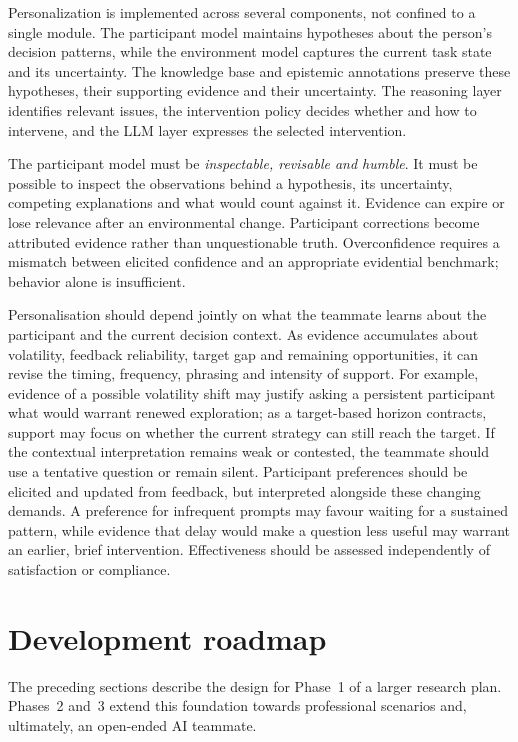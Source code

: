 \documentclass[11pt,a4paper]{article}
\begin{document}
Personalization is implemented across several components, not confined to a single module. The participant model maintains hypotheses about the person's decision patterns, while the environment model captures the current task state and its uncertainty. The knowledge base and epistemic annotations preserve these hypotheses, their supporting evidence and their uncertainty. The reasoning layer identifies relevant issues, the intervention policy decides whether and how to intervene, and the LLM layer expresses the selected intervention.

The participant model must be \emph{inspectable, revisable and humble}. It must be possible to inspect the observations behind a hypothesis, its uncertainty, competing explanations and what would count against it. Evidence can expire or lose relevance after an environmental change. Participant corrections become attributed evidence rather than unquestionable truth. Overconfidence requires a mismatch between elicited confidence and an appropriate evidential benchmark; behavior alone is insufficient.

Personalisation should depend jointly on what the teammate learns about the participant and the current decision context. As evidence accumulates about volatility, feedback reliability, target gap and remaining opportunities, it can revise the timing, frequency, phrasing and intensity of support. For example, evidence of a possible volatility shift may justify asking a persistent participant what would warrant renewed exploration; as a target-based horizon contracts, support may focus on whether the current strategy can still reach the target. If the contextual interpretation remains weak or contested, the teammate should use a tentative question or remain silent. Participant preferences should be elicited and updated from feedback, but interpreted alongside these changing demands. A preference for infrequent prompts may favour waiting for a sustained pattern, while evidence that delay would make a question less useful may warrant an earlier, brief intervention. Effectiveness should be assessed independently of satisfaction or compliance.

\section{Development roadmap}
The preceding sections describe the design for Phase~1 of a larger research plan. Phases~2 and~3 extend this foundation towards professional scenarios and, ultimately, an open-ended AI teammate.
\end{document}
